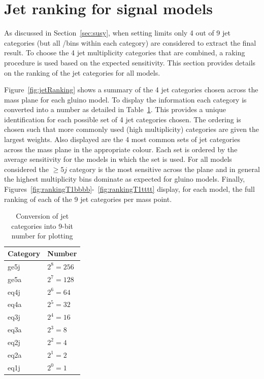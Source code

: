 \section{Jet ranking for signal models\label{app:jetRanking}}

As discussed in Section~\ref{sec:susy}, when setting limits only 4 out of 9 jet categories (but all \nb/\scalht bins
within each category) are considered to extract the final result. 
To choose the 4 jet multiplicity categories that are combined, a raking procedure 
is used based on the expected sensitivity. This section provides details on the ranking of the jet
categories for all models.

Figure~\ref{fig:jetRanking} shows a summary of the 4 jet categories chosen across the mass plane for each gluino model.
To display the information each category is converted into a number as detailed in Table~\ref{tab:jetConversion}.
This provides a unique identification for each possible set of 4 jet categories chosen. The ordering
is chosen such that more commonly used (high multiplicity) categories are given the largest weights.
Also displayed are the 4 most common sets of jet categories across the mass plane in the appropriate colour.
Each set is ordered by the average sensitivity for the models in which the set is used. For all models 
considered the $\geq5j$ category is the most sensitive across the plane 
and in general the highest \njet multiplicity bins dominate as expected for gluino models.
Finally, Figures~\ref{fig:rankingT1bbbb}-~\ref{fig:rankingT1tttt} display, for each model, 
the full ranking of each of the 9 jet categories per mass point.

\begin{table}[h!]
\caption{Conversion of jet categories into 9-bit number for plotting}
\label{tab:jetConversion}
\centering
\begin{tabular}{ll}
Category    & Number \\      
\hline \hline
ge5j & $2^{8} = 256$ \\
ge5a & $2^{7} = 128$ \\
eq4j & $2^{6} = 64$  \\
eq4a & $2^{5} = 32$  \\
eq3j & $2^{4} = 16$  \\
eq3a & $2^{3} = 8$   \\
eq2j & $2^{2} = 4$   \\
eq2a & $2^{1} = 2$   \\
eq1j & $2^{0} = 1$   \\
\end{tabular}
\end{table}

